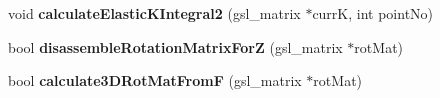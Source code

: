 \begin{DoxyCompactItemize}
\item 
\hypertarget{classShapeBase_a2011f33d1b4fd848d46d9faad66e1b7e}{}void {\bfseries calculate\+Elastic\+K\+Integral2} (gsl\+\_\+matrix $\ast$curr\+K, int point\+No)\label{classShapeBase_a2011f33d1b4fd848d46d9faad66e1b7e}

\item 
\hypertarget{classShapeBase_a91a660608ede71c5bfdd1c4956843760}{}bool {\bfseries disassemble\+Rotation\+Matrix\+For\+Z} (gsl\+\_\+matrix $\ast$rot\+Mat)\label{classShapeBase_a91a660608ede71c5bfdd1c4956843760}

\item 
\hypertarget{classShapeBase_a9b249ac3da27e7eeb6e0604a76f15faf}{}bool {\bfseries calculate3\+D\+Rot\+Mat\+From\+F} (gsl\+\_\+matrix $\ast$rot\+Mat)\label{classShapeBase_a9b249ac3da27e7eeb6e0604a76f15faf}

\end{DoxyCompactItemize}
